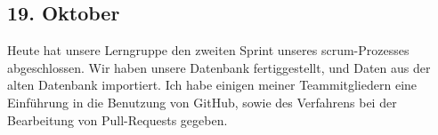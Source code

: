 \subsection{19. Oktober}
Heute hat unsere Lerngruppe den zweiten Sprint unseres scrum-Prozesses abgeschlossen. Wir haben unsere Datenbank fertiggestellt, und Daten aus der alten Datenbank importiert. Ich habe einigen meiner Teammitgliedern eine Einführung in die Benutzung von GitHub, sowie des Verfahrens bei der Bearbeitung von Pull-Requests gegeben.